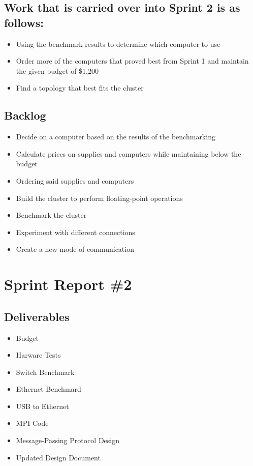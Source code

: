 \subsection*{Work that is carried over into Sprint 2 is as follows:}
\begin{itemize}
	\item Using the benchmark results to determine which computer to use
	\item Order more of the computers that proved best from Sprint 1 and maintain the given budget of \$1,200
	\item Find a topology that best fits the cluster
\end{itemize}

\subsection*{Backlog}
\begin{itemize}
	\item Decide on a computer based on the results of the benchmarking
	\item Calculate prices on supplies and computers while maintaining below the budget
	\item Ordering said supplies and computers
	\item Build the cluster to perform floating-point operations
	\item Benchmark the cluster
	\item Experiment with different connections
	\item Create a new mode of communication
\end{itemize}

\section{Sprint Report \#2}

\subsection*{Deliverables}
\begin{itemize}
	\item Budget
	\item Harware Tests
	\item Switch Benchmark
	\item Ethernet Benchmard
	\item USB to Ethernet
	\item MPI Code
	\item Message-Passing Protocol Design
	\item Updated Design Document
\end{itemize}

